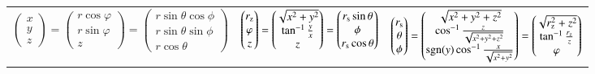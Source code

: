 {\begin{tabular}{c c c}
        $ 
        \begin{pmatrix}
            x \\ y \\ z
        \end{pmatrix} 
        =
        \begin{pmatrix}
            r \cos \varphi \\ r \sin \varphi \\ z
        \end{pmatrix}
        =
        \begin{pmatrix}
            r \sin \theta \cos \phi \\ r \sin \theta \sin \phi \\ r \cos \theta
        \end{pmatrix}
        $ &
        $ 
        \begin{pmatrix}
            r_{\rm z} \\ \varphi \\ z
        \end{pmatrix} 
        =
        \begin{pmatrix}
            \sqrt{x^2 + y^2} \\ \tan^{-1}\frac{y}{x} \\ z
        \end{pmatrix}
        =
        \begin{pmatrix}
            r_{\rm s} \sin \theta \\ \phi \\ r_{\rm s} \cos \theta
        \end{pmatrix}
        $ &
        $ 
        \begin{pmatrix}
            r_{\rm s} \\ \theta \\ \phi
        \end{pmatrix} 
        =
        \begin{pmatrix}
            \sqrt{x^2+y^2+z^2} \\ \cos^{-1} \frac{z}{\sqrt{x^2+y^2+z^2}} \\ \operatorname{sgn}(y) \cos^{-1} \frac{x}{\sqrt{x^2+y^2}}
        \end{pmatrix}
        =
        \begin{pmatrix}
            \sqrt{r_{\rm z}^2+z^2} \\ \tan^{-1}\frac{r_{\rm z}}{z} \\ \varphi
        \end{pmatrix}
        $ \\
    \end{tabular}
}
\smallskip
